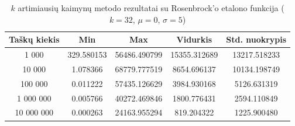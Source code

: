 \begin{table}[H]
    \centering
    \begin{tabular}{|c|c|c|c|c|}
        \hline
        \textbf{Taškų kiekis} & \textbf{Min} & \textbf{Max} & \textbf{Vidurkis} & \textbf{Std. nuokrypis} \\ \hline
        1 000        & 329.580153 & 56486.490799 & 15355.312689 & 13217.518233 \\ \hline
        10 000       & 1.078366 & 68779.777519 & 8654.696137 & 10134.198749 \\ \hline
        100 000      & 0.011222 & 57435.126629 & 3984.930168 & 5126.631319 \\ \hline
        1 000 000    & 0.005766 & 40272.469846 & 1800.776431 & 2594.110849 \\ \hline
        10 000 000   & 0.000263 & 24163.955294 & 819.204322 & 1225.900480 \\ \hline
    \end{tabular}
    \caption{$k$ artimiausių kaimynų metodo rezultatai su Rosenbrock'o etalono funkcija ($k = 32$, $\mu = 0$, $\sigma = 5$)}
\end{table}